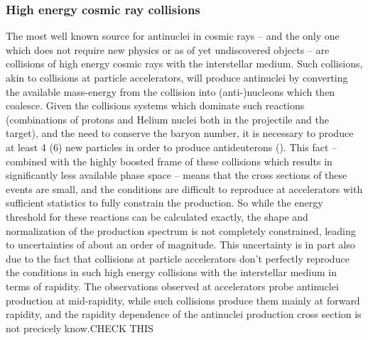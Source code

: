 \subsubsection{High energy cosmic ray collisions}
The most well known source for antinuclei in cosmic rays -- and the only one which does not require new physics or as of yet undiscovered objects -- are collisions of high energy cosmic rays with the interstellar medium. Such collisions, akin to collisions at particle accelerators, will produce antinuclei by converting the available mass-energy from the collision into (anti-)nucleons which then coalesce. Given the collisions systems which dominate such reactions (combinations of protons and Helium nuclei both in the projectile and the target), and the need to conserve the baryon number, it is necessary to produce at least 4 (6) new particles in order to produce antideuterons (\ahe). This fact -- combined with the highly boosted frame of these collisions which results in significantly less available phase space -- means that the cross sections of these events are small, and the conditions are difficult to reproduce at accelerators with sufficient statistics to fully constrain the production. So while the energy threshold for these reactions can be calculated exactly, the shape and normalization of the production spectrum is not completely constrained, leading to uncertainties of about an order of magnitude. This uncertainty is in part also due to the fact that collisions at particle accelerators don't perfectly reproduce the conditions in such high energy collisions with the interstellar medium in terms of rapidity. The observations observed at accelerators probe antinuclei production at mid-rapidity, while such collisions produce them mainly at forward rapidity, and the rapidity dependence of the antinuclei production cross section is not precicely know\cite{}.CHECK THIS \\

